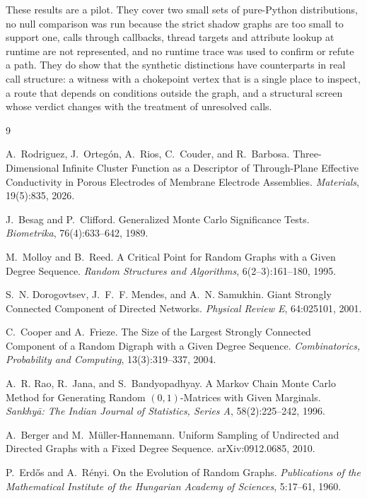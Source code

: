 \documentclass[11pt]{article}
\begin{document}
These results are a pilot. They cover two small sets of pure-Python distributions, no null comparison was run because the strict shadow graphs are too small to support one, calls through callbacks, thread targets and attribute lookup at runtime are not represented, and no runtime trace was used to confirm or refute a path. They do show that the synthetic distinctions have counterparts in real call structure: a witness with a chokepoint vertex that is a single place to inspect, a route that depends on conditions outside the graph, and a structural screen whose verdict changes with the treatment of unresolved calls.

\begin{thebibliography}{9}

A.~Rodriguez, J.~Orteg\'on, A.~Rios, C.~Couder, and R.~Barbosa.
\newblock Three-Dimensional Infinite Cluster Function as a Descriptor of Through-Plane Effective Conductivity in Porous Electrodes of Membrane Electrode Assemblies.
\newblock \emph{Materials}, 19(5):835, 2026.

J.~Besag and P.~Clifford.
\newblock Generalized Monte Carlo Significance Tests.
\newblock \emph{Biometrika}, 76(4):633--642, 1989.

M.~Molloy and B.~Reed.
\newblock A Critical Point for Random Graphs with a Given Degree Sequence.
\newblock \emph{Random Structures and Algorithms}, 6(2--3):161--180, 1995.

S.~N. Dorogovtsev, J.~F.~F. Mendes, and A.~N. Samukhin.
\newblock Giant Strongly Connected Component of Directed Networks.
\newblock \emph{Physical Review E}, 64:025101, 2001.

C.~Cooper and A.~Frieze.
\newblock The Size of the Largest Strongly Connected Component of a Random Digraph with a Given Degree Sequence.
\newblock \emph{Combinatorics, Probability and Computing}, 13(3):319--337, 2004.

A.~R. Rao, R.~Jana, and S.~Bandyopadhyay.
\newblock A Markov Chain Monte Carlo Method for Generating Random $(0,1)$-Matrices with Given Marginals.
\newblock \emph{Sankhy\={a}: The Indian Journal of Statistics, Series A}, 58(2):225--242, 1996.

A.~Berger and M.~M\"uller-Hannemann.
\newblock Uniform Sampling of Undirected and Directed Graphs with a Fixed Degree Sequence.
\newblock arXiv:0912.0685, 2010.

P.~Erd\H{o}s and A.~R\'enyi.
\newblock On the Evolution of Random Graphs.
\newblock \emph{Publications of the Mathematical Institute of the Hungarian Academy of Sciences}, 5:17--61, 1960.

\end{thebibliography}
\end{document}
